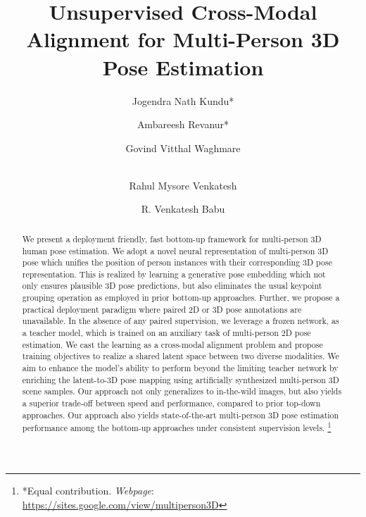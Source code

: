 \documentclass[runningheads]{llncs}
\makeatletter
\DeclareRobustCommand\onedot{\futurelet\@let@token\@onedot}
\def\@onedot{\ifx\@let@token.\else.\null\fi\xspace}
\def\etal{\emph{et al}\onedot}
\newcommand\blfootnote[1]{\begingroup
  \renewcommand\thefootnote{}\footnote{#1}\addtocounter{footnote}{-1}\endgroup
}
\makeatother
\begin{document}
\pagestyle{headings}
\mainmatter
\def\ECCVSubNumber{1766}  



\title{Unsupervised Cross-Modal Alignment for Multi-Person 3D Pose Estimation}

\authorrunning{Kundu \etal} 

\author{Jogendra Nath Kundu* \and Ambareesh Revanur* \and  Govind Vitthal Waghmare  \and \\ Rahul Mysore Venkatesh \and R. Venkatesh Babu}





\maketitle

\begin{abstract}

We present a deployment friendly, fast bottom-up framework for multi-person 3D human pose estimation. We adopt a novel neural representation of multi-person 3D pose which unifies the position of person instances with their corresponding 3D pose representation. This is realized by learning a generative pose embedding which not only ensures plausible 3D pose predictions, but also eliminates the usual keypoint grouping operation as employed in prior bottom-up approaches. Further, we propose a practical deployment paradigm where paired 2D or 3D pose annotations are unavailable. In the absence of any paired supervision, we leverage a frozen network, as a teacher model, which is trained on an auxiliary task of multi-person 2D pose estimation. We cast the learning as a cross-modal alignment problem and propose training objectives to realize a shared latent space between two diverse modalities. We aim to enhance the model's ability to perform beyond the limiting teacher network by enriching the latent-to-3D pose mapping using artificially synthesized multi-person 3D scene samples. Our approach not only generalizes to in-the-wild images, but also yields a superior trade-off between speed and performance, compared to prior top-down approaches. Our approach also yields state-of-the-art multi-person 3D pose estimation performance among the bottom-up approaches under consistent supervision levels. \blfootnote{{*Equal contribution.  {\textit{Webpage}}: \url{https://sites.google.com/view/multiperson3D}
}} 
\end{abstract}
\end{document}
